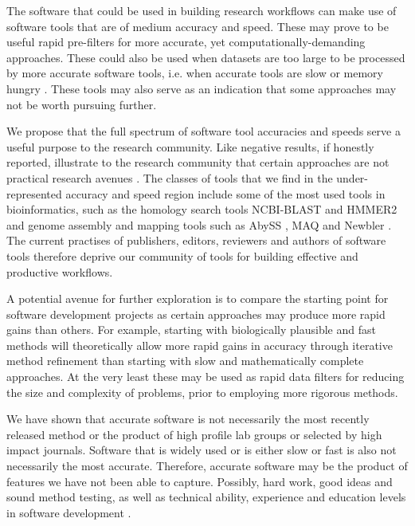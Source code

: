 \documentclass[fleqn,10pt]{SelfArx} %
\begin{document}
The software that could be used in building research workflows can make use of software tools that are of medium accuracy and speed. These may prove to be useful rapid pre-filters for more accurate, yet computationally-demanding approaches. These could also be used when datasets are too large to be processed by more accurate software tools, i.e. when accurate tools are slow or memory hungry \cite{Lowe1997-hq,Weinberg2006-tm}. These tools may also serve as an indication that some approaches may not be worth pursuing further.

We propose that the full spectrum of software tool accuracies and speeds serve a useful purpose to the research community. Like negative results, if honestly reported, illustrate to the research community that certain approaches are not practical research avenues \cite{Ioannidis2005-xh,Workman1999-au,Rivas2000-fb}. The classes of tools that we find in the under-represented accuracy and speed region include some of the most used tools in bioinformatics, such as the homology search tools NCBI-BLAST \cite{Altschul1990-ht,Altschul1997-ga} and HMMER2 \cite{Eddy:2009} and genome assembly and mapping tools such as AbySS \cite{Simpson:2009}, MAQ \cite{Li:2008} and Newbler \cite{Margulies:2005}. The current practises of publishers, editors, reviewers and authors of software tools therefore deprive our community of tools for building effective and productive workflows.

A potential avenue for further exploration is to compare the starting point for software development projects as certain approaches may produce more rapid gains than others. For example, starting with biologically plausible and fast methods will theoretically allow more rapid gains in accuracy through iterative method refinement than starting with slow and mathematically complete approaches. At the very least these may be used as rapid data filters for reducing the size and complexity of problems, prior to employing more rigorous methods. 


We have shown that accurate software is not necessarily the most recently released method or the product of high profile lab groups or selected by high impact journals. Software that is widely used or is either slow or fast is also not necessarily the most accurate. Therefore, accurate software may be the product of features we have not been able to capture. Possibly, hard work, good ideas and sound method testing, as well as technical ability, experience and education levels in software development \cite{Wilson2006-ih}. 
\end{document}
